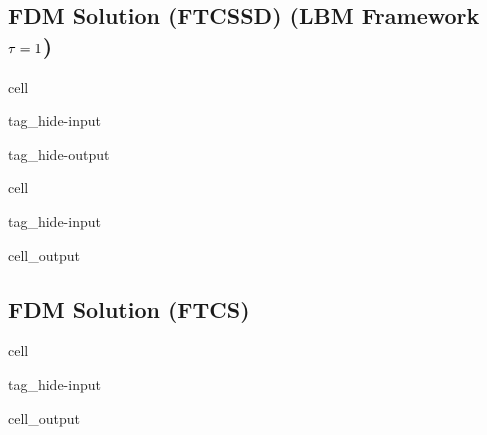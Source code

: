 \documentclass[letterpaper,10pt,english,openany,oneside]{jupyterBook}
\begin{document}
\subsection{FDM Solution (FTCS\sphinxhyphen{}SD) (LBM Framework \protect\(\tau=1\protect\))}
\label{\detokenize{LBM-Study/Convective-Diffusive-Equation:fdm-solution-ftcs-sd-lbm-framework-tau-1}}
\begin{sphinxuseclass}{cell}
\begin{sphinxuseclass}{tag_hide-input}
\begin{sphinxuseclass}{tag_hide-output}
\end{sphinxuseclass}
\end{sphinxuseclass}
\end{sphinxuseclass}
\begin{sphinxuseclass}{cell}
\begin{sphinxuseclass}{tag_hide-input}\begin{sphinxVerbatimOutput}

\begin{sphinxuseclass}{cell_output}
\noindent{}

\end{sphinxuseclass}\end{sphinxVerbatimOutput}

\end{sphinxuseclass}
\end{sphinxuseclass}

\subsection{FDM Solution (FTCS)}
\label{\detokenize{LBM-Study/Convective-Diffusive-Equation:fdm-solution-ftcs}}
\begin{sphinxuseclass}{cell}
\begin{sphinxuseclass}{tag_hide-input}\begin{sphinxVerbatimOutput}

\begin{sphinxuseclass}{cell_output}
\noindent{}

\end{sphinxuseclass}\end{sphinxVerbatimOutput}

\end{sphinxuseclass}
\end{sphinxuseclass}
\end{document}
